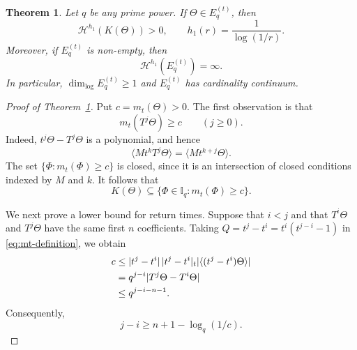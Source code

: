 \documentclass[11pt]{article}
\newtheorem{theorem}{Theorem}[section]
\theoremstyle{remark}
\newcommand{\Haus}{\mathcal{H}}
\newcommand{\Iq}{\mathbb{I}_q}
\newcommand{\Et}{E_q^{(t)}}
\newcommand{\mt}{m_t}
\begin{document}
\begin{theorem} \label{thm:t-conditional}
Let $q$ be any prime power.  If $\Theta\in\Et$, then
\begin{equation} \label{eq:t-orbit-positive}
 \Haus^{h_1}(K(\Theta))>0,
 \qquad h_1(r)=\frac1{\log(1/r)}.
\end{equation}
Moreover, if $\Et$ is non-empty, then
\begin{equation} \label{eq:t-exceptional-infinite}
 \Haus^{h_1}(\Et)=\infty.
\end{equation}
In particular, $\dim_{\log}\Et\geq1$ and $\Et$ has cardinality
continuum.
\end{theorem}

\begin{proof}[Proof of Theorem~\ref{thm:t-conditional}]
Put $c=\mt(\Theta)>0$.  The first observation is that
\begin{equation} \label{eq:t-shift-stability}
 \mt(T^j\Theta)\geq c\qquad(j\geq0).
\end{equation}
Indeed, $t^j\Theta-T^j\Theta$ is a polynomial, and hence
\[
 \langle Mt^kT^j\Theta\rangle
 =\langle Mt^{k+j}\Theta\rangle.
\]
The set $\{\Phi:\mt(\Phi)\geq c\}$ is closed, since it is an
intersection of closed conditions indexed by $M$ and $k$.  It
follows that
\begin{equation} \label{eq:t-closure-stability}
 K(\Theta)\subseteq\{\Phi\in\Iq:\mt(\Phi)\geq c\}.
\end{equation}

We next prove a lower bound for return times.  Suppose that $i<j$
and that $T^i\Theta$ and $T^j\Theta$ have the same first $n$
coefficients.  Taking $Q=t^j-t^i=t^i(t^{j-i}-1)$ in
\eqref{eq:mt-definition}, we obtain
\begin{align} \label{eq:t-return-computation}
 c
 &\leq |t^j-t^i|\,|t^j-t^i|_t
       |\langle(t^j-t^i)\Theta\rangle| \notag\\
 &=q^{j-i}|T^j\Theta-T^i\Theta|\\
 &\leq q^{j-i-n-1}. \notag
\end{align}
Consequently,
\begin{equation} \label{eq:t-return-time}
 j-i\geq n+1-\log_q(1/c).
\end{equation}


\end{proof}
\end{document}
